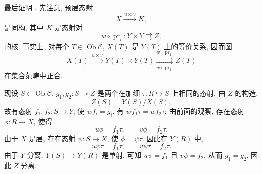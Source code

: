 最后证明 .
先注意, 预层态射
\[
  X\xrightarrow{\,u\boxtimes v\,}K,
\]
是同构, 其中 \(K\) 是态射对
\[
  w\circ\operatorname{pr}_i:Y\times Y\rightrightarrows Z,
\]
的核. 事实上, 对每个 \(T\in\operatorname{Ob}\mathscr C\),
\(X(T)\) 是 \(Y(T)\) 上的等价关系, 因而图
\[
  X(T)\xrightarrow{\,u\boxtimes v\,}Y(T)\times Y(T)
  \overset{w\circ\operatorname{pr}_1}
    {\underset{w\circ\operatorname{pr}_2}{\rightrightarrows}}
  Z(T)
\]
在集合范畴中正合.

现设 \(S\in\operatorname{Ob}\mathscr C\),
\(g_1,g_2:S\to Z\) 是两个在加细
\(\tau:R\hookrightarrow S\) 上相同的态射.
由 \(Z\) 的构造,
\[
  Z(S)=Y(S)/X(S),
\]
故有态射 \(f_1,f_2:S\to Y\), 使 \(wf_i=g_i\).
有 \(wf_1\tau=wf_2\tau\); 由前面的观察, 存在态射
\(\phi:R\to X\), 使得
\[
  u\phi=f_1\tau,\qquad v\phi=f_2\tau.
\]
由于 \(X\) 是层, 存在态射 \(\psi:S\to X\),
使 \(\phi=\psi\tau\). 因此在 \(Y(R)\) 中,
\[
  u\psi\tau=f_1\tau,\qquad v\psi\tau=f_2\tau.
\]
由于 \(Y\) 分离, \(Y(S)\to Y(R)\) 是单射,
可知 \(u\psi=f_1\) 且 \(v\psi=f_2\), 从而 \(g_1=g_2\).
因此 \(Z\) 分离.

